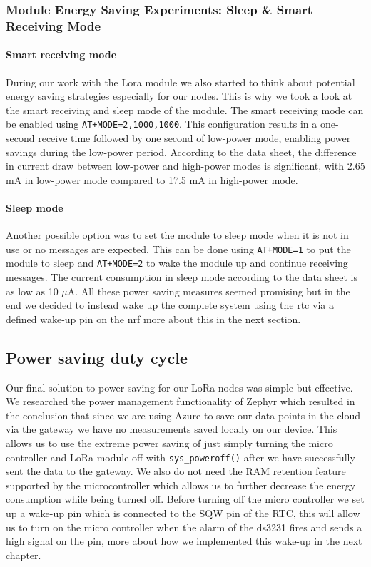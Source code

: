 \subsubsection{Module Energy Saving Experiments: Sleep \& Smart Receiving Mode}

\paragraph{Smart receiving mode} \hfill \break
During our work with the Lora module we also started to think about potential energy saving strategies especially for our nodes. This is why we took a look at the smart receiving and sleep mode of the module. The smart receiving mode can be enabled using \texttt{AT+MODE=2,1000,1000}. This configuration results in a one-second receive time followed by one second of low-power mode, enabling power savings during the low-power period. According to the data sheet, the difference in current draw between low-power and high-power modes is significant, with 2.65 mA in low-power mode compared to 17.5 mA in high-power mode.

\paragraph{Sleep mode} \hfill \break
Another possible option was to set the module to sleep mode when it is not in use or no messages are expected. This can be done using \texttt{AT+MODE=1} to put the module to sleep and \texttt{AT+MODE=2} to wake the module up and continue receiving messages. The current consumption in sleep mode according to the data sheet is as low as 10 $\mu$A. \hfill
\break
All these power saving measures seemed promising but in the end we decided to instead wake up the complete system using the rtc via a defined wake-up pin on the nrf more about this in the next section.

\subsection{Power saving duty cycle}

Our final solution to power saving for our LoRa nodes was simple but effective. We researched the power management functionality of Zephyr which resulted in the conclusion that since we are using Azure to save our data points in the cloud via the gateway we have no measurements saved locally on our device. This allows us to use the extreme power saving of just simply turning the micro controller and LoRa module off with \texttt{sys\_poweroff()} after we have successfully sent the data to the gateway. We also do not need the RAM retention feature supported by the microcontroller which allows us to further decrease the energy consumption while being turned off. Before turning off the micro controller we set up a wake-up pin which is connected to the SQW pin of the RTC, this will allow us to turn on the micro controller when the alarm of the ds3231 fires and sends a high signal on the pin, more about how we implemented this wake-up in the next chapter. 
\hfill
\break
\newline

